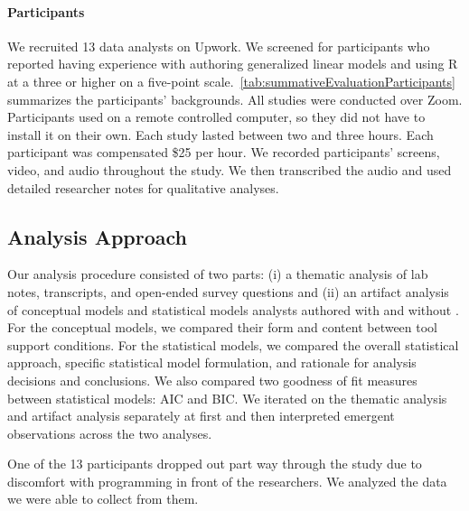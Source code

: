 \noindent \paragraph{Participants} We recruited 13 data analysts on Upwork. We
screened for participants who reported having experience with authoring
generalized linear models and using R at a three or higher on a five-point
scale.~\autoref{tab:summativeEvaluationParticipants} summarizes the
participants' backgrounds. All studies were conducted over Zoom. Participants used \rTisane
on a remote controlled computer, so they did not have to install it on their
own. Each study lasted between two and three hours. Each participant was compensated
\$25 per hour. We recorded participants' screens, video, and audio throughout
the study. We then transcribed the audio and used detailed researcher notes for
qualitative analyses.

\tableSummativeEvalParticipants

\subsection{Analysis Approach}
Our analysis procedure consisted of two parts: (i) a thematic analysis of lab
notes, transcripts, and open-ended survey questions and (ii) an artifact
analysis of conceptual models and statistical models analysts authored with and
without \rTisane. For the conceptual models, we compared their form and content
between tool support conditions. For the statistical models, we compared the
overall statistical approach, specific statistical model formulation, and
rationale for analysis decisions and conclusions. We also compared two goodness
of fit measures between statistical models: AIC and BIC. We iterated on the
thematic analysis and artifact analysis separately at first and then interpreted
emergent observations across the two analyses. 

One of the 13 participants dropped out part way through the study due to
discomfort with programming in front of the researchers. We analyzed the data we
were able to collect from them. 

